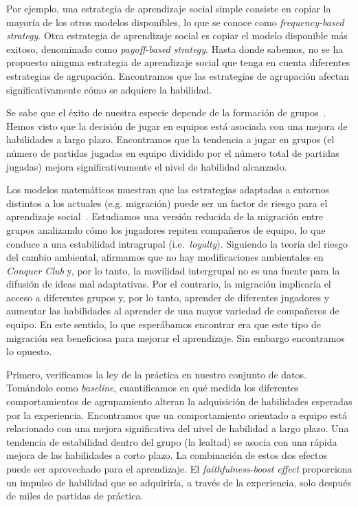 \documentclass[a4paper,11pt]{book}
\theoremstyle{definition}
\begin{document}

Por ejemplo, una estrategia de aprendizaje social simple consiste en copiar la mayor\'ia de los otros modelos disponibles, lo que se conoce como \emph{frequency-based strategy}.
%
Otra estrategia de aprendizaje social es copiar el modelo disponible m\'as exitoso, denominado como \emph{payoff-based strategy}.
%
Hasta donde sabemos, no se ha propuesto ninguna estrategia de aprendizaje social que tenga en cuenta diferentes estrategias de agrupaci\'on.
%
Encontramos que las estrategias de agrupaci\'on afectan significativamente c\'omo se adquiere la habilidad.


Se sabe que el \'exito de nuestra especie depende de la formaci\'on de grupos~\cite{Richerson2010,dunbar1993-coevolutionNeocorticalSizeGroupSizeAndLanguage}.
%
Hemos visto que la decisi\'on de jugar en equipos est\'a asociada con una mejora de habilidades a largo plazo.
%
Encontramos que la tendencia a jugar en grupos (el n\'umero de partidas jugadas en equipo dividido por el n\'umero total de partidas jugadas) mejora significativamente el nivel de habilidad alcanzado.


Los modelos matem\'aticos muestran que las estrategias adaptadas a entornos distintos a los actuales (e.g. migraci\'on) puede ser un factor de riesgo para el aprendizaje social~\cite{boyd1989-socialLearningAsAdaptation}.
%
Estudiamos una versi\'on reducida de la migraci\'on entre grupos analizando c\'omo los jugadores repiten compa\~neros de equipo, lo que conduce a una estabilidad intragrupal (i.e.~\emph{loyalty}).
%
Siguiendo la teor\'ia del riesgo del cambio ambiental, afirmamos que no hay modificaciones ambientales en \emph{Conquer Club} y, por lo tanto, la movilidad intergrupal no es una fuente para la difusi\'on de ideas mal adaptativas.
%
Por el contrario, la migraci\'on implicar\'ia el acceso a diferentes grupos y, por lo tanto, aprender de diferentes jugadores y aumentar las habilidades al aprender de una mayor variedad de compa\~neros de equipo.
%
En este sentido, lo que esper\'abamos encontrar era que este tipo de migraci\'on sea beneficiosa para mejorar el aprendizaje.
%
Sin embargo encontramos lo opuesto.


Primero, verificamos la ley de la pr\'actica en nuestro conjunto de datos.
%
%
Tom\'andolo como \emph{baseline}, cuantificamos en qu\'e medida los diferentes comportamientos de agrupamiento alteran la adquisici\'on de habilidades esperadas por la experiencia.
%
Encontramos que un comportamiento orientado a equipo est\'a relacionado con una mejora significativa del nivel de habilidad a largo plazo.
%
Una tendencia de estabilidad dentro del grupo (la lealtad) se asocia con una r\'apida mejora de las habilidades a corto plazo.
%
La combinaci\'on de estos dos efectos puede ser aprovechado para el aprendizaje.
%
El \emph{faithfulness-boost effect} proporciona un impulso de habilidad que se adquirir\'ia, a trav\'es de la experiencia, solo despu\'es de miles de partidas de pr\'actica.
\end{document}
